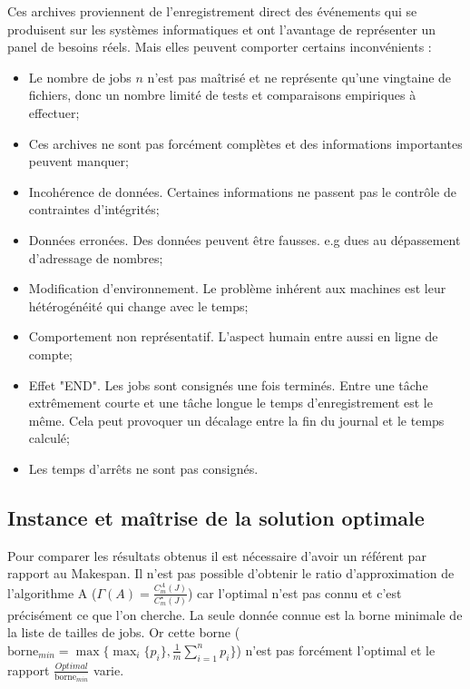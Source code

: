 \documentclass[a4paper,12pt]{report}
\theoremstyle{plain}				%
\theoremstyle{definition}				%
\newcommand{\lp}[1]{\todo[author=LP,color=yellow,inline]{#1}}
\begin{document}
Ces archives proviennent de l'enregistrement direct des événements qui se produisent sur les systèmes informatiques et ont l'avantage de représenter un panel de besoins réels. 
Mais elles peuvent comporter certains inconvénients :
\begin{itemize}

	\item Le nombre de jobs $n$ n'est pas maîtrisé et ne représente qu'une 
	vingtaine de fichiers, donc un nombre limité de tests et comparaisons empiriques à effectuer;
	
	\item Ces archives ne sont pas forcément complètes et des informations importantes peuvent manquer;
	
	\item Incohérence de données. Certaines informations ne passent pas le con\-trôle de
	contraintes d'intégrités;
	
	\item Données erronées. Des données peuvent être fausses. e.g dues au dépassement d'adressage de nombres;
	
	\item Modification d'environnement. Le problème inhérent aux machines 
	est leur hétérogénéité qui change avec le temps;
	
	\item Comportement non représentatif. L'aspect humain entre aussi en ligne de compte;
	
	\item Effet "END". Les jobs sont consignés une fois terminés. 
	Entre une tâche extrêmement courte et une tâche longue le temps 
	d'enregistrement est le même. Cela peut provoquer un décalage 
	entre la fin du journal et le temps calculé;
	
	\item Les temps d'arrêts ne sont pas consignés. 
	  
\end{itemize}

\subsection{Instance et maîtrise de la solution optimale}
\label{ssec:instancesMaitriseSolutionOptimale}

Pour comparer les résultats obtenus il est nécessaire d'avoir un référent par rapport au Makespan. 
Il n'est pas possible d'obtenir le ratio d'approximation de l'algorithme A ($\Gamma(A)=\frac{C_m^A(J)}{C_m^\star(J)}$) car l'optimal n'est pas connu et c'est précisément ce que l'on cherche. 
La seule donnée connue est la borne minimale de la liste de tailles de jobs.
Or cette borne ($\text{borne}_{min} = \max \{ \max_i\{p_i\}, \frac{1}{m} \sum_{i=1}^{n} p_i \}$) n'est pas forcément l'optimal et le rapport $\frac{Optimal}{\text{borne}_{min}}$ varie.
\end{document}

